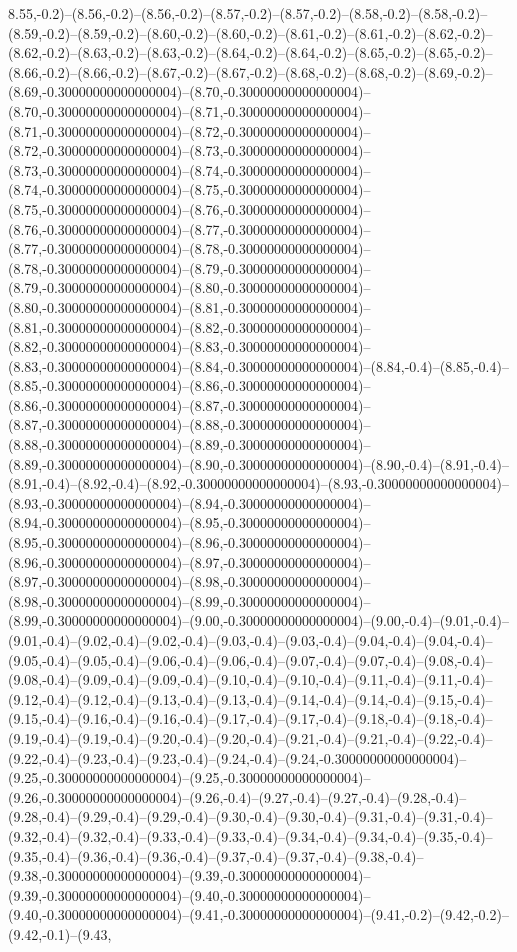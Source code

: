 8.55,-0.2)--(8.56,-0.2)--(8.56,-0.2)--(8.57,-0.2)--(8.57,-0.2)--(8.58,-0.2)--(8.58,-0.2)--(8.59,-0.2)--(8.59,-0.2)--(8.60,-0.2)--(8.60,-0.2)--(8.61,-0.2)--(8.61,-0.2)--(8.62,-0.2)--(8.62,-0.2)--(8.63,-0.2)--(8.63,-0.2)--(8.64,-0.2)--(8.64,-0.2)--(8.65,-0.2)--(8.65,-0.2)--(8.66,-0.2)--(8.66,-0.2)--(8.67,-0.2)--(8.67,-0.2)--(8.68,-0.2)--(8.68,-0.2)--(8.69,-0.2)--(8.69,-0.30000000000000004)--(8.70,-0.30000000000000004)--(8.70,-0.30000000000000004)--(8.71,-0.30000000000000004)--(8.71,-0.30000000000000004)--(8.72,-0.30000000000000004)--(8.72,-0.30000000000000004)--(8.73,-0.30000000000000004)--(8.73,-0.30000000000000004)--(8.74,-0.30000000000000004)--(8.74,-0.30000000000000004)--(8.75,-0.30000000000000004)--(8.75,-0.30000000000000004)--(8.76,-0.30000000000000004)--(8.76,-0.30000000000000004)--(8.77,-0.30000000000000004)--(8.77,-0.30000000000000004)--(8.78,-0.30000000000000004)--(8.78,-0.30000000000000004)--(8.79,-0.30000000000000004)--(8.79,-0.30000000000000004)--(8.80,-0.30000000000000004)--(8.80,-0.30000000000000004)--(8.81,-0.30000000000000004)--(8.81,-0.30000000000000004)--(8.82,-0.30000000000000004)--(8.82,-0.30000000000000004)--(8.83,-0.30000000000000004)--(8.83,-0.30000000000000004)--(8.84,-0.30000000000000004)--(8.84,-0.4)--(8.85,-0.4)--(8.85,-0.30000000000000004)--(8.86,-0.30000000000000004)--(8.86,-0.30000000000000004)--(8.87,-0.30000000000000004)--(8.87,-0.30000000000000004)--(8.88,-0.30000000000000004)--(8.88,-0.30000000000000004)--(8.89,-0.30000000000000004)--(8.89,-0.30000000000000004)--(8.90,-0.30000000000000004)--(8.90,-0.4)--(8.91,-0.4)--(8.91,-0.4)--(8.92,-0.4)--(8.92,-0.30000000000000004)--(8.93,-0.30000000000000004)--(8.93,-0.30000000000000004)--(8.94,-0.30000000000000004)--(8.94,-0.30000000000000004)--(8.95,-0.30000000000000004)--(8.95,-0.30000000000000004)--(8.96,-0.30000000000000004)--(8.96,-0.30000000000000004)--(8.97,-0.30000000000000004)--(8.97,-0.30000000000000004)--(8.98,-0.30000000000000004)--(8.98,-0.30000000000000004)--(8.99,-0.30000000000000004)--(8.99,-0.30000000000000004)--(9.00,-0.30000000000000004)--(9.00,-0.4)--(9.01,-0.4)--(9.01,-0.4)--(9.02,-0.4)--(9.02,-0.4)--(9.03,-0.4)--(9.03,-0.4)--(9.04,-0.4)--(9.04,-0.4)--(9.05,-0.4)--(9.05,-0.4)--(9.06,-0.4)--(9.06,-0.4)--(9.07,-0.4)--(9.07,-0.4)--(9.08,-0.4)--(9.08,-0.4)--(9.09,-0.4)--(9.09,-0.4)--(9.10,-0.4)--(9.10,-0.4)--(9.11,-0.4)--(9.11,-0.4)--(9.12,-0.4)--(9.12,-0.4)--(9.13,-0.4)--(9.13,-0.4)--(9.14,-0.4)--(9.14,-0.4)--(9.15,-0.4)--(9.15,-0.4)--(9.16,-0.4)--(9.16,-0.4)--(9.17,-0.4)--(9.17,-0.4)--(9.18,-0.4)--(9.18,-0.4)--(9.19,-0.4)--(9.19,-0.4)--(9.20,-0.4)--(9.20,-0.4)--(9.21,-0.4)--(9.21,-0.4)--(9.22,-0.4)--(9.22,-0.4)--(9.23,-0.4)--(9.23,-0.4)--(9.24,-0.4)--(9.24,-0.30000000000000004)--(9.25,-0.30000000000000004)--(9.25,-0.30000000000000004)--(9.26,-0.30000000000000004)--(9.26,-0.4)--(9.27,-0.4)--(9.27,-0.4)--(9.28,-0.4)--(9.28,-0.4)--(9.29,-0.4)--(9.29,-0.4)--(9.30,-0.4)--(9.30,-0.4)--(9.31,-0.4)--(9.31,-0.4)--(9.32,-0.4)--(9.32,-0.4)--(9.33,-0.4)--(9.33,-0.4)--(9.34,-0.4)--(9.34,-0.4)--(9.35,-0.4)--(9.35,-0.4)--(9.36,-0.4)--(9.36,-0.4)--(9.37,-0.4)--(9.37,-0.4)--(9.38,-0.4)--(9.38,-0.30000000000000004)--(9.39,-0.30000000000000004)--(9.39,-0.30000000000000004)--(9.40,-0.30000000000000004)--(9.40,-0.30000000000000004)--(9.41,-0.30000000000000004)--(9.41,-0.2)--(9.42,-0.2)--(9.42,-0.1)--(9.43,